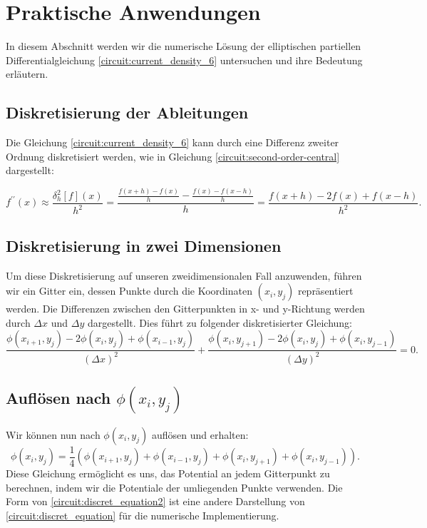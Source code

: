 \section{Praktische Anwendungen}
In diesem Abschnitt werden wir die numerische Lösung der elliptischen partiellen Differentialgleichung \eqref{circuit:current_density_6} untersuchen und ihre Bedeutung erläutern.

\subsection{Diskretisierung der Ableitungen} Die Gleichung \eqref{circuit:current_density_6} kann durch eine Differenz zweiter Ordnung diskretisiert werden, wie in Gleichung \eqref{circuit:second-order-central} dargestellt:

\begin{equation}
	f^{\prime \prime}(x) \approx \frac{\delta_h^2[f](x)}{h^2}=\frac{\frac{f(x+h)-f(x)}{h}-\frac{f(x)-f(x-h)}{h}}{h}=\frac{f(x+h)-2 f(x)+f(x-h)}{h^2}.
	\label{circuit:second-order-central}
\end{equation}
\cite{enwiki:1220817436}

\subsection{Diskretisierung in zwei Dimensionen} Um diese Diskretisierung auf unseren zweidimensionalen Fall anzuwenden, führen wir ein Gitter ein, dessen Punkte durch die Koordinaten $(x_i, y_j)$ repräsentiert werden. Die Differenzen zwischen den Gitterpunkten in x- und y-Richtung werden durch $\Delta x$ und $\Delta y$ dargestellt. Dies führt zu folgender diskretisierter Gleichung:
\begin{equation}
	\frac{\phi(x_{i+1}, y_j) - 2\phi(x_i, y_j) + \phi(x_{i-1}, y_j)}{(\Delta x)^2} + \frac{\phi(x_i, y_{j+1}) - 2\phi(x_i, y_j) + \phi(x_i, y_{j-1})}{(\Delta y)^2} = 0.
	\label{circuit:discret_equation}
\end{equation}

\subsection{Auflösen nach $\phi(x_i, y_j)$} 
Wir können nun nach $\phi(x_i, y_j)$ auflösen und erhalten:
\begin{equation}
	\phi(x_i, y_j) = \frac{1}{4}(\phi(x_{i+1}, y_{j}) + \phi(x_{i-1}, y_{j}) + \phi(x_{i}, y_{j+1}) + \phi(x_{i}, y_{j-1})).
	\label{circuit:discret_equation2}
\end{equation}
Diese Gleichung ermöglicht es uns, das Potential an jedem Gitterpunkt zu berechnen, indem wir die Potentiale der umliegenden Punkte verwenden. Die Form von \eqref{circuit:discret_equation2} ist eine andere Darstellung von \eqref{circuit:discret_equation} für die numerische Implementierung.

